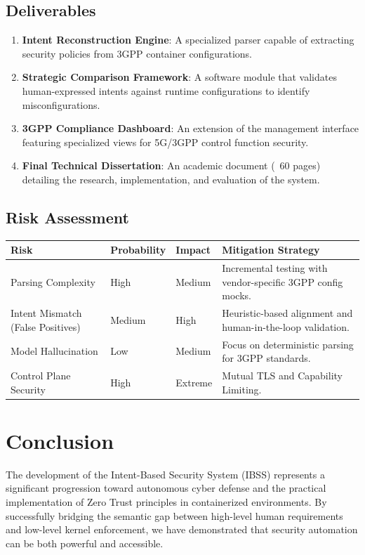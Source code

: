 \documentclass[12pt,a4paper]{article}
\begin{document}
\subsection{Deliverables}
\begin{enumerate}
    \item \textbf{Intent Reconstruction Engine}: A specialized parser capable of extracting security policies from 3GPP container configurations.
    \item \textbf{Strategic Comparison Framework}: A software module that validates human-expressed intents against runtime configurations to identify misconfigurations.
    \item \textbf{3GPP Compliance Dashboard}: An extension of the management interface featuring specialized views for 5G/3GPP control function security.
    \item \textbf{Final Technical Dissertation}: An academic document (~60 pages) detailing the research, implementation, and evaluation of the system.
\end{enumerate}

\subsection{Risk Assessment}
\begin{table}[h]
\centering
\begin{tabularx}{\textwidth}{@{} X l l l @{}}
\toprule
\textbf{Risk} & \textbf{Probability} & \textbf{Impact} & \textbf{Mitigation Strategy} \\ \midrule
Parsing Complexity & High & Medium & Incremental testing with vendor-specific 3GPP config mocks. \\
Intent Mismatch (False Positives) & Medium & High & Heuristic-based alignment and human-in-the-loop validation. \\
Model Hallucination & Low & Medium & Focus on deterministic parsing for 3GPP standards. \\
Control Plane Security & High & Extreme & Mutual TLS and Capability Limiting. \\ \bottomrule
\end{tabularx}
\end{table}

\newpage

\section{Conclusion}
The development of the Intent-Based Security System (IBSS) represents a significant progression toward autonomous cyber defense and the practical implementation of Zero Trust principles in containerized environments. By successfully bridging the semantic gap between high-level human requirements and low-level kernel enforcement, we have demonstrated that security automation can be both powerful and accessible.
\end{document}

